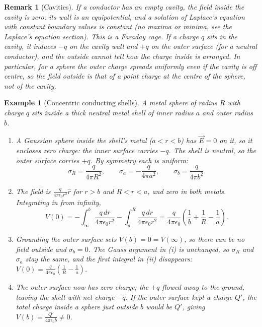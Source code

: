 \documentclass{article}
\newtheorem*{example}{Example}
\newtheorem{remark}{Remark}
\begin{document}
\begin{remark}[Cavities]
    If a conductor has an empty cavity, the field inside the cavity is zero: its wall is an equipotential, and a solution of Laplace's equation with constant boundary values is constant (no maxima or minima, see the Laplace's equation section). This is a Faraday cage. If a charge $q$ sits in the cavity, it induces $-q$ on the cavity wall and $+q$ on the outer surface (for a neutral conductor), and the outside cannot tell how the charge inside is arranged. In particular, for a sphere the outer charge spreads uniformly even if the cavity is off centre, so the field outside is that of a point charge at the centre of the sphere, not of the cavity.
\end{remark}
\begin{example}[Concentric conducting shells]
    A metal sphere of radius $R$ with charge $q$ sits inside a thick neutral metal shell of inner radius $a$ and outer radius $b$.
    \begin{enumerate}[label=(\roman*)]
        \item A Gaussian sphere inside the shell's metal ($a < r < b$) has $\vec{E} = 0$ on it, so it encloses zero charge: the inner surface carries $-q$. The shell is neutral, so the outer surface carries $+q$. By symmetry each is uniform:
        \[\sigma_R = \frac{q}{4\pi R^2}, \qquad \sigma_a = -\frac{q}{4\pi a^2}, \qquad \sigma_b = \frac{q}{4\pi b^2}.\]
        \item The field is $\frac{q}{4\pi\epsilon_0 r^2}\hat{r}$ for $r > b$ and $R < r < a$, and zero in both metals. Integrating in from infinity,
        \[V(0) = -\int_\infty^b\frac{q\,dr}{4\pi\epsilon_0 r^2} - \int_a^R\frac{q\,dr}{4\pi\epsilon_0 r^2} = \frac{q}{4\pi\epsilon_0}\left(\frac{1}{b} + \frac{1}{R} - \frac{1}{a}\right).\]
        \item Grounding the outer surface sets $V(b) = 0 = V(\infty)$, so there can be no field outside and $\sigma_b = 0$. The Gauss argument in (i) is unchanged, so $\sigma_R$ and $\sigma_a$ stay the same, and the first integral in (ii) disappears: $V(0) = \frac{q}{4\pi\epsilon_0}\left(\frac{1}{R} - \frac{1}{a}\right)$.
        \item The outer surface now has zero charge; the $+q$ flowed away to the ground, leaving the shell with net charge $-q$. If the outer surface kept a charge $Q'$, the total charge inside a sphere just outside $b$ would be $Q'$, giving $V(b) = \frac{Q'}{4\pi\epsilon_0 b} \neq 0$.
    \end{enumerate}
\end{example}
\end{document}

